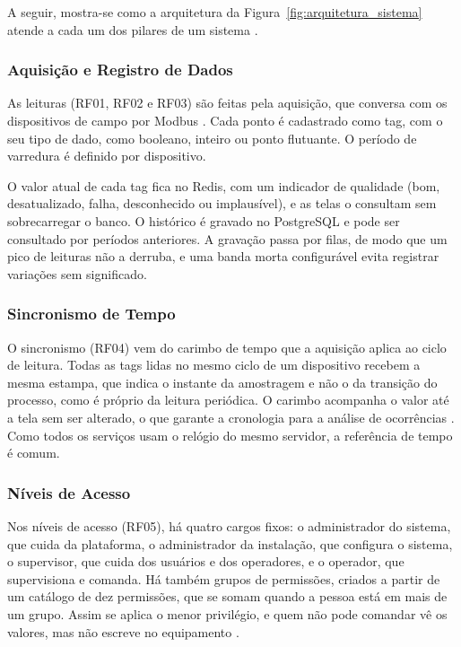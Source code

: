 \par A seguir, mostra-se como a arquitetura da Figura~\ref{fig:arquitetura_sistema} atende a cada um dos pilares de um sistema  \cite{ZANGHI2019_SCADA_CONCEITOS}.

\subsubsection{Aquisição e Registro de Dados}

\par As leituras (RF01, RF02 e RF03) são feitas pela aquisição, que conversa com os dispositivos de campo por Modbus \cite{MODBUS_TCP_IMPLEMENTATION_GUIDE}. Cada ponto é cadastrado como tag, com o seu tipo de dado, como booleano, inteiro ou ponto flutuante. O período de varredura é definido por dispositivo.

\par O valor atual de cada tag fica no Redis, com um indicador de qualidade (bom, desatualizado, falha, desconhecido ou implausível), e as telas o consultam sem sobrecarregar o banco. O histórico é gravado no PostgreSQL e pode ser consultado por períodos anteriores. A gravação passa por filas, de modo que um pico de leituras não a derruba, e uma banda morta configurável evita registrar variações sem significado.

\subsubsection{Sincronismo de Tempo}

\par O sincronismo (RF04) vem do carimbo de tempo que a aquisição aplica ao ciclo de leitura. Todas as tags lidas no mesmo ciclo de um dispositivo recebem a mesma estampa, que indica o instante da amostragem e não o da transição do processo, como é próprio da leitura periódica. O carimbo acompanha o valor até a tela sem ser alterado, o que garante a cronologia para a análise de ocorrências \cite{ZANGHI2019_SCADA_CONCEITOS}. Como todos os serviços usam o relógio do mesmo servidor, a referência de tempo é comum.

\subsubsection{Níveis de Acesso}

\par Nos níveis de acesso (RF05), há quatro cargos fixos: o administrador do sistema, que cuida da plataforma, o administrador da instalação, que configura o sistema, o supervisor, que cuida dos usuários e dos operadores, e o operador, que supervisiona e comanda. Há também grupos de permissões, criados a partir de um catálogo de dez permissões, que se somam quando a pessoa está em mais de um grupo. Assim se aplica o menor privilégio, e quem não pode comandar vê os valores, mas não escreve no equipamento \cite{STOUFFER2015_NIST_ICS_SECURITY}.

